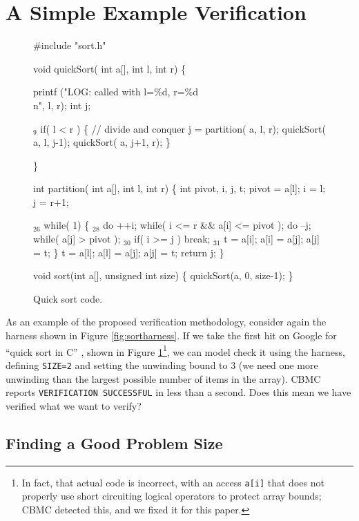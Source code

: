 \documentclass[conference]{IEEEtran}
\begin{document}
\section{A Simple Example Verification}

\begin{figure}
{\scriptsize
\begin{code}
 \#include "sort.h"

 void quickSort( int a[], int l, int r)
 \{

   printf ("LOG: called with l=\%d, r=\%d\\n", l, r); 
   int j;

{$_9$}  if( l < r ) 
     \{
       // divide and conquer
       j = partition( a, l, r);
       quickSort( a, l, j-1);
       quickSort( a, j+1, r);
     \}
  
 \}

 int partition( int a[], int l, int r) \{
   int pivot, i, j, t;
   pivot = a[l];
   i = l; j = r+1;
  
{$_{26}$} while( 1)
     \{
{$_{28}$}     do ++i; while( i <= r \&\& a[i] <= pivot );
       do --j; while( a[j] > pivot );
{$_{30}$}     if( i >= j ) break;
{$_{31}$}     t = a[i]; a[i] = a[j]; a[j] = t;
     \}
   t = a[l]; a[l] = a[j]; a[j] = t;
   return j;
 \}


 void sort(int a[], unsigned int size) \{
   quickSort(a, 0, size-1);
 \}
\end{code}
}
\caption{Quick sort code.}
\label{fig:qsort}
\end{figure}

As an example of the proposed verification methodology, consider again
the harness shown in Figure \ref{fig:sortharness}.  If we take the
first hit on Google for ``quick sort in C'' \cite{quicksortcode},
shown in Figure \ref{fig:qsort}\footnote{In fact, that actual code is
  incorrect, with an access {\tt a[i]} that does not properly use
  short circuiting logical operators to protect array bounds; CBMC
  detected this, and we fixed it for this paper.}, we can model check
it using the harness, defining {\tt SIZE=2} and setting the unwinding
bound to 3 (we need one more unwinding than the largest possible
number of items in the array).  CBMC reports {\tt VERIFICATION
  SUCCESSFUL} in less than a second.  Does this mean we have verified
what we want to verify?

\subsection{Finding a Good Problem Size}
\label{sec:unwind}
\end{document}

